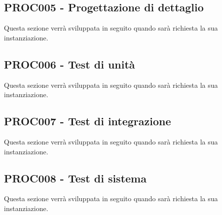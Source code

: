 \documentclass[PianoDiQualifica.tex]{subfiles}
\begin{document}
\subsection{PROC005 - Progettazione di dettaglio}
Questa sezione verrà sviluppata in seguito quando sarà richiesta la sua instanziazione.
\subsection{PROC006 - Test di unità}
Questa sezione verrà sviluppata in seguito quando sarà richiesta la sua instanziazione.
\subsection{PROC007 - Test di integrazione}
Questa sezione verrà sviluppata in seguito quando sarà richiesta la sua instanziazione.
\subsection{PROC008 - Test di sistema}
Questa sezione verrà sviluppata in seguito quando sarà richiesta la sua instanziazione.
\end{document}
